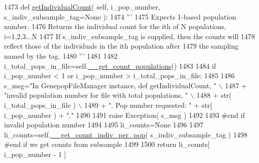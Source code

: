 \begin{DoxyCode}
1473     \textcolor{keyword}{def }\hyperlink{classnegui_1_1genepopfilemanager_1_1GenepopFileManager_a05e723069f5129b21a4d017c2a5317b0}{getIndividualCount}( self, i\_pop\_number, s\_indiv\_subsample\_tag=None ):
1474         \textcolor{stringliteral}{'''}
1475 \textcolor{stringliteral}{        Expects 1-based population number.}
1476 \textcolor{stringliteral}{        Returns the individual count for the ith of N populations, i=1,2,3...N}
1477 \textcolor{stringliteral}{        If s\_indiv\_subsample\_tag is supplied, then the counts will}
1478 \textcolor{stringliteral}{        reflect those of the individuals in the ith population after}
1479 \textcolor{stringliteral}{        the sampling named by the tag.}
1480 \textcolor{stringliteral}{        '''}
1481 
1482         i\_total\_pops\_in\_file=self.\hyperlink{classnegui_1_1genepopfilemanager_1_1GenepopFileManager_a51f6dcbd17c80f8e61114b11283b655f}{\_\_get\_count\_populations}()  
1483 
1484         \textcolor{keywordflow}{if} i\_pop\_number < 1 \textcolor{keywordflow}{or} i\_pop\_number > i\_total\_pops\_in\_file:
1485 
1486             s\_msg=\textcolor{stringliteral}{"In GenepopFileManager instance, def getIndividualCount, "} \(\backslash\)
1487                     + \textcolor{stringliteral}{"invalid population number for file with total populations, "} \(\backslash\)
1488                     + str( i\_total\_pops\_in\_file ) \(\backslash\)
1489                     + \textcolor{stringliteral}{".  Pop number requested: "} + str( i\_pop\_number ) + \textcolor{stringliteral}{"."}
1490 
1491             \textcolor{keywordflow}{raise} Exception( s\_msg )
1492 
1493         \textcolor{comment}{#end if  invalid population number}
1494 
1495         li\_counts=\textcolor{keywordtype}{None}
1496 
1497         li\_counts=self.\hyperlink{classnegui_1_1genepopfilemanager_1_1GenepopFileManager_a8efe11151549d7da2bc024f836491af4}{\_\_get\_count\_indiv\_per\_pop}( s\_indiv\_subsample\_tag )
1498         \textcolor{comment}{#end if we get counts from subsample}
1499 
1500         \textcolor{keywordflow}{return} li\_counts[ i\_pop\_number - 1 ]
\end{DoxyCode}
